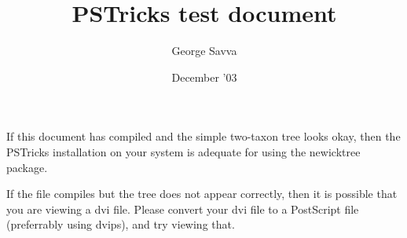 \documentclass{article}
\begin{document}
\title{\textsf{PSTricks} test document}
\author{George Savva}
\date{December '03}
\maketitle

If this document has compiled and the simple two-taxon tree looks okay, then the \textsf{PSTricks} installation on your system is adequate for using the \textsf{newicktree} package.

If the file compiles but the tree does not appear correctly, then it is possible that you are viewing a dvi file.  Please convert your dvi file to a PostScript file (preferrably using dvips), and try viewing that.

\end{document}
